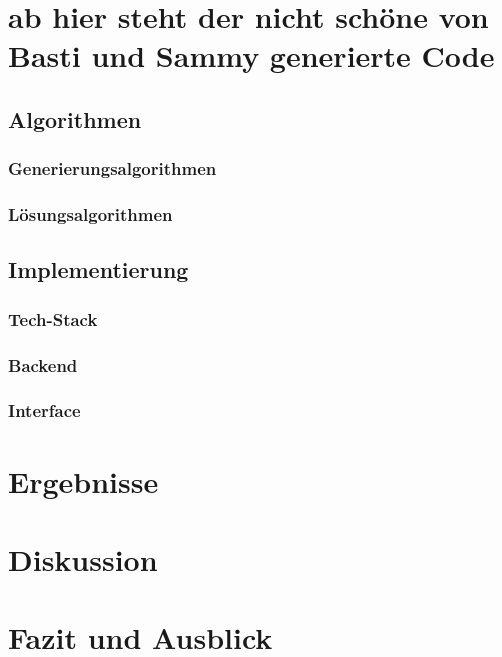 \documentclass[12pt,a4paper]{article}
\begin{document}


\section{ab hier steht der nicht schöne von Basti und Sammy generierte Code}
\subsection{Algorithmen}
\subsubsection{Generierungsalgorithmen}


\subsubsection{Lösungsalgorithmen}


\subsection{Implementierung}

\subsubsection{Tech-Stack}


\subsubsection{Backend}
\subsubsection{Interface}

\section{Ergebnisse}

\section{Diskussion}

\section{Fazit und Ausblick}



\end{document}
